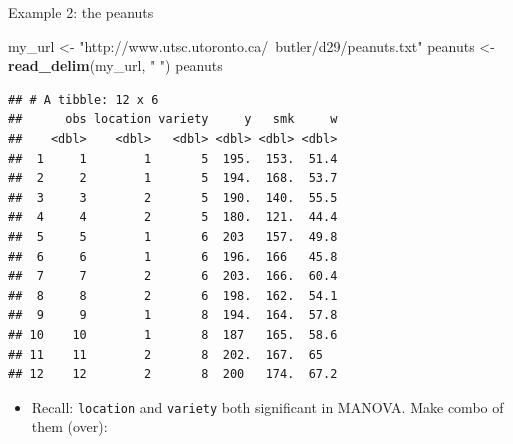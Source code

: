 \documentclass[
  ignorenonframetext,
]{beamer}
\newenvironment{Shaded}{\begin{snugshade}}{\end{snugshade}}
\newcommand{\KeywordTok}[1]{\textcolor[rgb]{0.13,0.29,0.53}{\textbf{#1}}}
\newcommand{\NormalTok}[1]{#1}
\newcommand{\StringTok}[1]{\textcolor[rgb]{0.31,0.60,0.02}{#1}}
\providecommand{\tightlist}{%
  \setlength{\itemsep}{0pt}\setlength{\parskip}{0pt}}
\begin{document}
\begin{frame}[fragile]{Example 2: the peanuts}
\protect\hypertarget{example-2-the-peanuts}{}

\scriptsize

\begin{Shaded}
\begin{Highlighting}[]
\NormalTok{my_url <-}\StringTok{ "http://www.utsc.utoronto.ca/~butler/d29/peanuts.txt"}
\NormalTok{peanuts <-}\StringTok{ }\KeywordTok{read_delim}\NormalTok{(my_url, }\StringTok{" "}\NormalTok{)}
\NormalTok{peanuts}
\end{Highlighting}
\end{Shaded}

\begin{verbatim}
## # A tibble: 12 x 6
##      obs location variety     y   smk     w
##    <dbl>    <dbl>   <dbl> <dbl> <dbl> <dbl>
##  1     1        1       5  195.  153.  51.4
##  2     2        1       5  194.  168.  53.7
##  3     3        2       5  190.  140.  55.5
##  4     4        2       5  180.  121.  44.4
##  5     5        1       6  203   157.  49.8
##  6     6        1       6  196.  166   45.8
##  7     7        2       6  203.  166.  60.4
##  8     8        2       6  198.  162.  54.1
##  9     9        1       8  194.  164.  57.8
## 10    10        1       8  187   165.  58.6
## 11    11        2       8  202.  167.  65  
## 12    12        2       8  200   174.  67.2
\end{verbatim}

\normalsize

\begin{itemize}
\tightlist
\item
  Recall: \texttt{location} and \texttt{variety} both significant in
  MANOVA. Make combo of them (over):
\end{itemize}

\end{frame}
\end{document}
